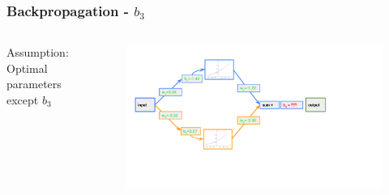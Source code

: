 \documentclass[aspectratio=169]{beamer}
\begin{document}
\begin{frame}[fragile]\frametitle{Backpropagation - $b_3$}
\begin{columns}
    Assumption: Optimal parameters except $b_3$
        \begin{figure}
        \centering
        \includegraphics[trim={1cm 3cm 5cm 0.35cm },clip,width=\linewidth]{BP_6}
        \end{figure}
\end{columns}
\end{frame}
\end{document}
